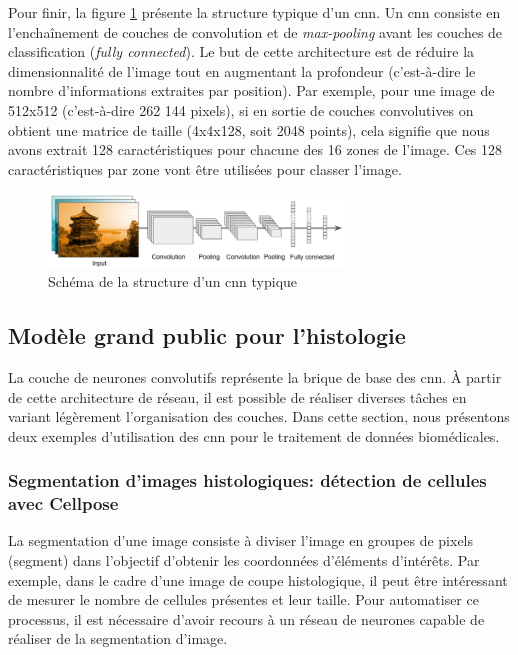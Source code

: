 Pour finir, la figure \ref{fig:cnn_archi} présente la structure typique d'un \gls{cnn}. Un \gls{cnn} consiste en l'enchaînement de couches de convolution et de \textit{max-pooling} avant les couches de classification (\textit{fully connected}). Le but de cette architecture est de réduire la dimensionnalité de l'image tout en augmentant la profondeur (c'est-à-dire le nombre d'informations extraites par position). Par exemple, pour une image de 512x512 (c'est-à-dire 262 144 pixels), si en sortie de couches convolutives on obtient une matrice de taille (4x4x128, soit 2048 points), cela signifie que nous avons extrait 128 caractéristiques pour chacune des 16 zones de l'image. Ces 128 caractéristiques par zone vont être utilisées pour classer l'image.
\begin{figure}[!ht]
 \centering
 \includegraphics[width=0.7\textwidth]{figures/cnn_simple.png}
 \caption[Schéma de la structure d'un \gls{cnn} typique]{Schéma de la structure d'un \gls{cnn} typique}
 \label{fig:cnn_archi}
\end{figure}
\subsection{Modèle grand public pour l'histologie}
La couche de neurones convolutifs représente la brique de base des \gls{cnn}. À partir de cette architecture de réseau, il est possible de réaliser diverses tâches en variant légèrement l'organisation des couches. Dans cette section, nous présentons deux exemples d'utilisation des \gls{cnn} pour le traitement de données biomédicales.

\subsubsection{Segmentation d'images histologiques: détection de cellules avec Cellpose}
La segmentation d'une image consiste à diviser l'image en groupes de pixels (segment) dans l'objectif d'obtenir les coordonnées d'éléments d'intérêts. Par exemple, dans le cadre d'une image de coupe histologique, il peut être intéressant de mesurer le nombre de cellules présentes et leur taille. Pour automatiser ce processus, il est nécessaire d'avoir recours à un réseau de neurones capable de réaliser de la segmentation d'image.


